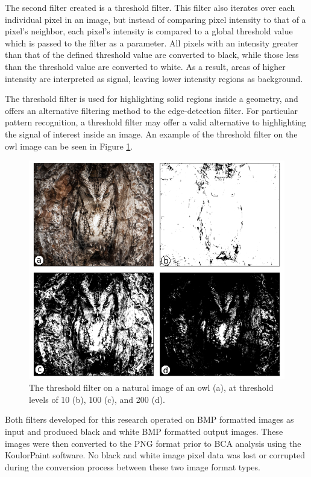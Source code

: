 \documentclass[12pt, oneside]{book}
\begin{document}
The second filter created is a threshold filter.  This filter also iterates over each individual pixel in an image, but instead of comparing pixel intensity to that of a pixel's neighbor, each pixel's intensity is compared to a global threshold value which is passed to the filter as a parameter.  All pixels with an intensity greater than that of the defined threshold value are converted to black, while those less than the threshold value are converted to white. As a result, areas of higher intensity are interpreted as signal, leaving lower intensity regions as background.

The threshold filter is used for highlighting solid regions inside a geometry, and offers an alternative filtering method to the edge-detection filter.  For particular pattern recognition, a threshold filter may offer a valid alternative to highlighting the signal of interest inside an image.  An example of the threshold filter on the owl image can be seen in Figure \ref{fig:threshfilter}.

\begin{figure}[!b]
  \centering
  \includegraphics[width=\textwidth]{figures/owl_thresh.png}
  \caption[The threshold filter on a natural image of an owl]{The threshold filter on a natural image of an owl (a), at threshold levels of 10 (b), 100 (c), and 200 (d).}
  \label{fig:threshfilter}
\end{figure} 

Both filters developed for this research operated on BMP formatted images as input and produced black and white BMP formatted output images.  These images were then converted to the PNG format prior to BCA analysis using the KoulorPaint software.  No black and white image pixel data was lost or corrupted during the conversion process between these two image format types.
\end{document}
